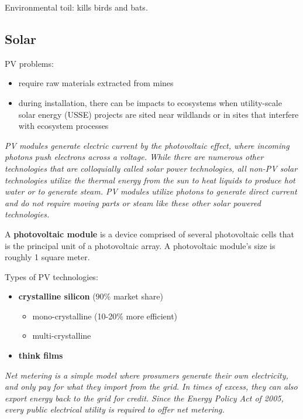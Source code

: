 Environmental toil: kills birds and bats.

\subsection{Solar}

PV problems:

\begin{itemize}
	\item require raw materials extracted from mines
	\item during installation, there can be impacts to ecosystems when
	utility-scale solar energy (USSE) projects are sited near wildlands or
	in sites that interfere with ecosystem processes
\end{itemize}

\textit{
PV modules generate electric current by
the photovoltaic effect, where incoming photons push electrons across a voltage.
While there are numerous other technologies that are colloquially called solar
power technologies, all non-PV solar technologies utilize the thermal energy
from the sun to heat liquids to produce hot water or to generate steam. PV
modules utilize photons to generate direct current and do not require moving
parts or steam like these other solar powered technologies.
}

A \textbf{photovoltaic module} is a device comprised of several photovoltaic
cells that is the principal unit of a photovoltaic array. A photovoltaic
module’s size is roughly 1 square meter.

Types of PV technologies:

\begin{itemize}
	\item \textbf{crystalline silicon} (90\% market share)
		\begin{itemize}
			\item mono-crystalline (10-20\% more efficient)
			\item multi-crystalline
		\end{itemize}
	\item \textbf{think films}
\end{itemize}

\textit{
Net metering is a simple model where prosumers generate their own
electricity, and only pay for what they import from the grid. In times of
excess, they can also export energy back to the grid for credit. Since the
Energy Policy Act of 2005, every public electrical utility is required to
offer net metering.
}

